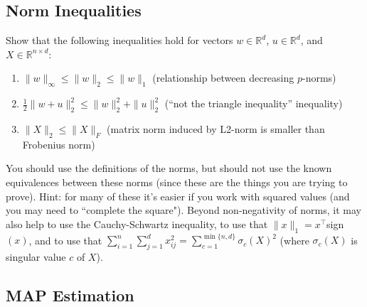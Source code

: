 \documentclass{article}
\def\blu#1{{\color{blu}#1}}
\def\red#1{{\color{red}#1}}
\def\norm#1{\|#1\|}
\def\R{\mathbb{R}}
\def\enum#1{\begin{enumerate}#1\end{enumerate}}
\begin{document}
\subsection{Norm Inequalities}

Show that the following inequalities hold for vectors $w \in \R^d$, $u \in \R^d$, and $X \in \R^{n\times d}$:
\blu{\enum{
\item $\norm{w}_\infty \leq \norm{w}_2 \leq \norm{w}_1$ (relationship between decreasing $p$-norms)
\item $\frac{1}{2}\norm{w+u}_2^2 \leq  \norm{w}_2^2 + \norm{u}_2^2$ (``not the triangle inequality'' inequality)
\item $\norm{X}_2 \leq \norm{X}_F$ (matrix  norm induced by L2-norm is \red{smaller} than Frobenius norm)
}
}
You should use the definitions of the norms, but should not use the %
known equivalences between these norms (since these are the things you are trying to prove).
Hint: for many of these it's easier if you work with squared values (and you may need to ``complete the square"). Beyond non-negativity of norms, it may also help to use the Cauchy-Schwartz inequality, to use that $\norm{x}_1 = x^\top $sign$(x)$, and to use that $\sum_{i=1}^n\sum_{j=1}^d x_{ij}^2 = \sum_{c = 1}^{\min\{n,d\}}\sigma_c(X)^2$ (where $\sigma_c(X)$ is singular value $c$ of $X$).



\subsection{MAP Estimation}
\end{document}

